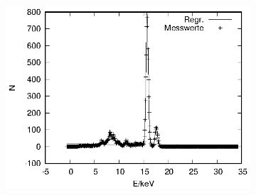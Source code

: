 \begin{figure}[!h]
\begin{subfigure}[h]{0.5\textwidth}
  \end{subfigure}%
  \begin{subfigure}[h]{0.5\textwidth}
    \centering
    \includegraphics{data/Massenanteil/zr.eps}
  \end{subfigure}
\end{figure}

